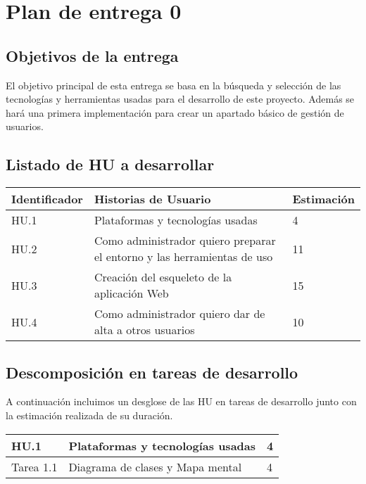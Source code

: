 \section{Plan de entrega 0}

\subsection{Objetivos de la entrega}

El objetivo principal de esta entrega se basa en la búsqueda y selección de las tecnologías y herramientas usadas para el desarrollo de este proyecto. Además se hará una primera implementación para crear un apartado básico de gestión de usuarios.

\subsection{Listado de HU a desarrollar}

\begin{table}[h]
	\centering
	\begin{tabular}{| p{2.3cm} | p{6.7cm} | p{2cm} |}
		\rowcolor[HTML]{329A9D} 
		{\color[HTML]{FFFFFF} \textbf{Identificador}} & {\color[HTML]{FFFFFF} \textbf{Historias de Usuario}} & {\color[HTML]{FFFFFF} \textbf{Estimación}}  \\ \hline
		HU.1 & Plataformas y tecnologías usadas & 4 \\ \hline   
		HU.2 & Como administrador quiero preparar el entorno y las herramientas de uso & 11 \\ \hline   
		HU.3 & Creación del esqueleto de la aplicación Web & 15 \\ \hline
		HU.4 & Como administrador quiero dar de alta a otros usuarios & 10 \\ \hline
	\end{tabular}
\end{table}

\newpage

\subsection{Descomposición en tareas de desarrollo}

A continuación incluimos un desglose de las HU en tareas de desarrollo junto con la estimación realizada de su duración.\\

\begin{table}[h]
	\centering
	\begin{tabular}{| p{2.3cm} | p{6.7cm} | p{2cm} |}
		\rowcolor[HTML]{329A9D} 
		{\color[HTML]{FFFFFF} \textbf{HU.1}} & {\color[HTML]{FFFFFF} \textbf{Plataformas y tecnologías usadas}} & {\color[HTML]{FFFFFF} \textbf{4}}  \\ \hline
		Tarea 1.1 & Diagrama de clases y Mapa mental & 4 \\ \hline
	\end{tabular}
\end{table}

